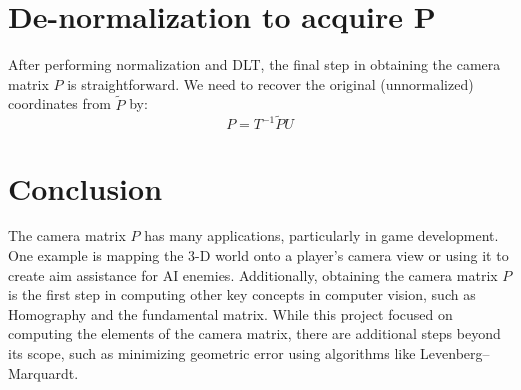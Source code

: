 \documentclass[12pt]{article}
\begin{document}
\section{De-normalization to acquire P}
After performing normalization and DLT, the final step in obtaining the camera matrix \( P \) is straightforward. We need to recover the original (unnormalized) coordinates from \( \tilde{P} \) by:
\[
P = T^{-1} \tilde{P} U
\]

\section{Conclusion}
The camera matrix \( P \) has many applications, particularly in game development. One example is mapping the 3-D world onto a player's camera view or using it to create aim assistance for AI enemies. Additionally, obtaining the camera matrix \( P \) is the first step in computing other key concepts in computer vision, such as Homography and the fundamental matrix. While this project focused on computing the elements of the camera matrix, there are additional steps beyond its scope, such as minimizing geometric error using algorithms like Levenberg–Marquardt.

\newpage
\end{document}
